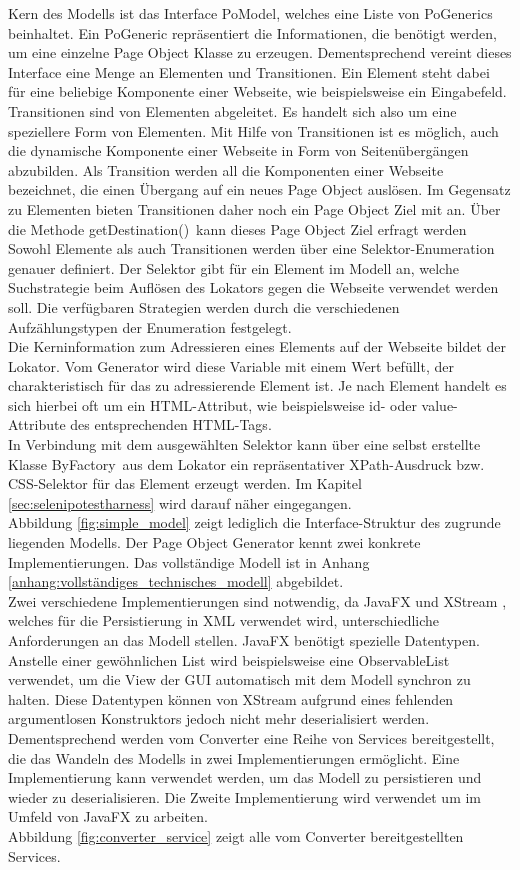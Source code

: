 Kern des Modells ist das Interface PoModel, welches eine Liste von PoGenerics beinhaltet. Ein PoGeneric repräsentiert die Informationen, die benötigt werden, um eine einzelne Page Object Klasse zu erzeugen. Dementsprechend vereint dieses Interface eine Menge an Elementen und Transitionen.
Ein Element steht dabei für eine beliebige Komponente einer Webseite, wie beispielsweise ein Eingabefeld.
Transitionen sind von Elementen abgeleitet. Es handelt sich also um eine speziellere Form von Elementen. Mit Hilfe von Transitionen ist es möglich, auch die dynamische Komponente einer Webseite in Form von Seitenübergängen abzubilden. Als Transition werden all die Komponenten einer Webseite bezeichnet, die einen Übergang auf ein neues Page Object auslösen. Im Gegensatz zu Elementen bieten Transitionen daher noch ein Page Object Ziel mit an. Über die Methode \grq getDestination()\grq\ kann dieses Page Object Ziel erfragt werden\\
Sowohl Elemente als auch Transitionen werden über eine Selektor-Enumeration genauer definiert.
Der Selektor gibt für ein Element im Modell an, welche Suchstrategie beim Auflösen des Lokators gegen die Webseite verwendet werden soll.
Die verfügbaren Strategien werden durch die verschiedenen Aufzählungstypen der Enumeration festgelegt.\\
Die Kerninformation zum Adressieren eines Elements auf der Webseite bildet der Lokator. Vom Generator wird diese Variable mit einem Wert befüllt, der charakteristisch für das zu adressierende Element ist. Je nach Element handelt es sich hierbei oft um ein HTML-Attribut, wie beispielsweise id- oder value-Attribute des entsprechenden HTML-Tags.\\
In Verbindung mit dem ausgewählten Selektor kann über eine selbst erstellte Klasse \grq ByFactory\grq\ aus dem Lokator ein repräsentativer XPath-Ausdruck bzw. CSS-Selektor für das Element erzeugt werden. Im Kapitel \ref{sec:selenipotestharness} wird darauf näher eingegangen.\\
Abbildung \ref{fig:simple_model} zeigt lediglich die Interface-Struktur des zugrunde liegenden Modells. Der Page Object Generator kennt zwei konkrete Implementierungen. Das vollständige Modell ist in Anhang \ref{anhang:vollständiges_technisches_modell} abgebildet.\\
Zwei verschiedene Implementierungen sind notwendig, da JavaFX und XStream \cite{joe_walnes_xstream_2015}, welches für die Persistierung in XML verwendet wird, unterschiedliche Anforderungen an das Modell stellen. JavaFX benötigt spezielle Datentypen. Anstelle einer gewöhnlichen List wird beispielsweise eine ObservableList verwendet, um die View der GUI automatisch mit dem Modell synchron zu halten. Diese Datentypen können von XStream aufgrund eines fehlenden argumentlosen Konstruktors jedoch nicht mehr deserialisiert werden.
Dementsprechend werden vom Converter eine Reihe von Services bereitgestellt, die das Wandeln des Modells in zwei Implementierungen ermöglicht. Eine Implementierung kann verwendet werden, um das Modell zu persistieren und wieder zu deserialisieren. Die Zweite Implementierung wird verwendet um im Umfeld von JavaFX zu arbeiten.\\
Abbildung \ref{fig:converter_service} zeigt alle vom Converter bereitgestellten Services. 

